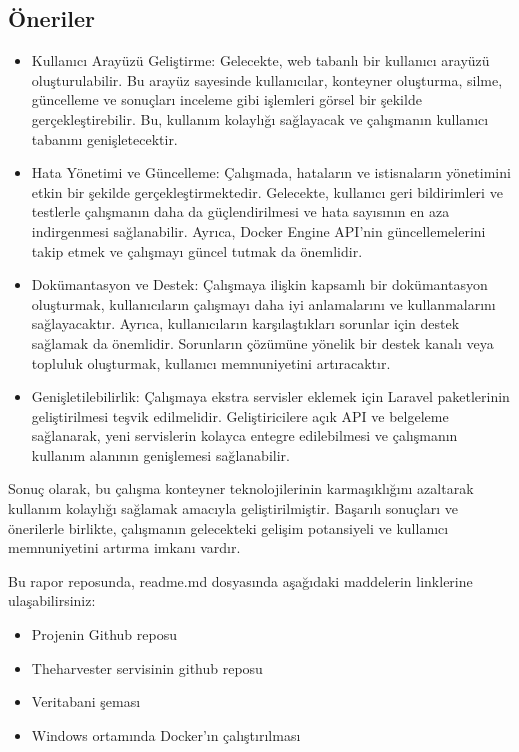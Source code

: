 \subsection*{Öneriler}
\begin{itemize}
    \item Kullanıcı Arayüzü Geliştirme: Gelecekte, web tabanlı bir kullanıcı arayüzü oluşturulabilir. Bu arayüz sayesinde kullanıcılar, konteyner oluşturma, silme, güncelleme ve sonuçları inceleme gibi işlemleri görsel bir şekilde gerçekleştirebilir. Bu, kullanım kolaylığı sağlayacak ve çalışmanın kullanıcı tabanını genişletecektir.
    \item Hata Yönetimi ve Güncelleme: Çalışmada, hataların ve istisnaların yönetimini etkin bir şekilde gerçekleştirmektedir. Gelecekte, kullanıcı geri bildirimleri ve testlerle çalışmanın daha da güçlendirilmesi ve hata sayısının en aza indirgenmesi sağlanabilir. Ayrıca, Docker Engine API'nin güncellemelerini takip etmek ve çalışmayı güncel tutmak da önemlidir.
    \item Dokümantasyon ve Destek: Çalışmaya ilişkin kapsamlı bir dokümantasyon oluşturmak, kullanıcıların çalışmayı daha iyi anlamalarını ve kullanmalarını sağlayacaktır. Ayrıca, kullanıcıların karşılaştıkları sorunlar için destek sağlamak da önemlidir. Sorunların çözümüne yönelik bir destek kanalı veya topluluk oluşturmak, kullanıcı memnuniyetini artıracaktır.
    \item Genişletilebilirlik: Çalışmaya ekstra servisler eklemek için Laravel paketlerinin geliştirilmesi teşvik edilmelidir. Geliştiricilere açık API ve belgeleme sağlanarak, yeni servislerin kolayca entegre edilebilmesi ve çalışmanın kullanım alanının genişlemesi sağlanabilir.
\end{itemize}

Sonuç olarak, bu çalışma konteyner teknolojilerinin karmaşıklığını azaltarak kullanım kolaylığı sağlamak amacıyla geliştirilmiştir. Başarılı sonuçları ve önerilerle birlikte, çalışmanın gelecekteki gelişim potansiyeli ve kullanıcı memnuniyetini artırma imkanı vardır.

Bu rapor reposunda, readme.md dosyasında aşağıdaki maddelerin linklerine ulaşabilirsiniz:
\begin{itemize}
    \item Projenin Github reposu
    \item Theharvester servisinin github reposu
    \item Veritabani şeması
    \item Windows ortamında Docker'ın çalıştırılması
\end{itemize}


